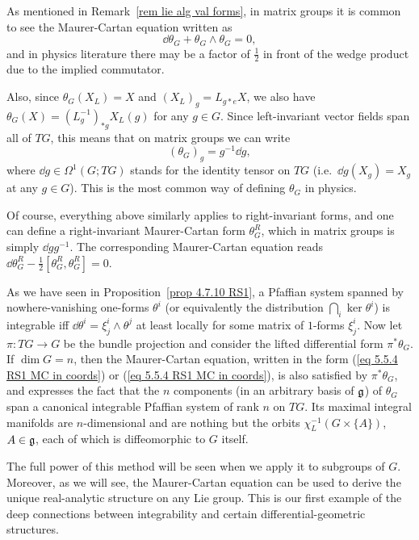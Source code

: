 
\begin{rem}
    As mentioned in Remark~\ref{rem lie alg val forms}, in matrix groups it is common to see the Maurer-Cartan equation written as 
    \[\dd\theta_G +\theta_G\wedge\theta_G=0,\]
    and in physics literature there may be a factor of $\frac12$ in front of the wedge product due to the implied commutator.

    Also, since $\theta_G(X_L)=X$ and $(X_L)_g=L_{g\ast e}X$, we also have $\theta_G(X)=(L_{g}^{-1})_{\ast g}X_L(g)$ for any $g\in G$. Since left-invariant vector fields span all of $TG$, this means that on matrix groups we can write 
    \[(\theta_G)_g=g^{-1}\dd g,\]
    where $\dd g\in \Omega^1(G;TG)$ stands for the identity tensor on $TG$ (i.e.~$\dd g(X_g)=X_g$ at any $g\in G$). This is the most common way of defining $\theta_G$ in physics.
\end{rem}

\begin{rem}
    Of course, everything above similarly applies to right-invariant forms, and one can define a right-invariant Maurer-Cartan form $\theta_G^R$, which in matrix groups is simply $\dd g g^{-1}$. The corresponding Maurer-Cartan equation reads $\dd\theta_G^R-\frac12[\theta_G^R,\theta_G^R]=0$.
\end{rem}

\begin{rem}
    As we have seen  in Proposition~\ref{prop 4.7.10 RS1}, a Pfaffian system spanned by nowhere-vanishing one-forms $\theta^i$ (or equivalently the distribution $\bigcap_i\ker\theta^i$) is integrable iff $\dd \theta^i=\xi^i_j\wedge\theta^j$ at least locally for some matrix of $1$-forms $\xi^i_j$. Now let $\pi:TG\to G$ be the bundle projection and consider the lifted differential form $\pi^\ast\theta_G$. If $\dim G=n$, then the Maurer-Cartan equation, written in the form (\ref{eq 5.5.4 RS1 MC in coords}) or (\ref{eq 5.5.4 RS1 MC in coords}), is also satisfied by $\pi^\ast\theta_G$, and expresses the fact that the $n$ components (in an arbitrary basis of $\mathfrak{g}$) of $\theta_G$ span a canonical integrable Pfaffian system of rank $n$ on $TG$. Its maximal integral manifolds are $n$-dimensional and are nothing but the orbits $\chi_L^{-1}(G\times \{A\})$, $A\in\mathfrak{g}$, each of which is diffeomorphic to $G$ itself. 
    
    The full power of this method will be seen when we apply it to subgroups of $G$. Moreover, as we will see, the Maurer-Cartan equation can be used to derive the unique real-analytic structure on any Lie group. This is our first example of the deep connections between integrability and certain differential-geometric structures.
\end{rem}

